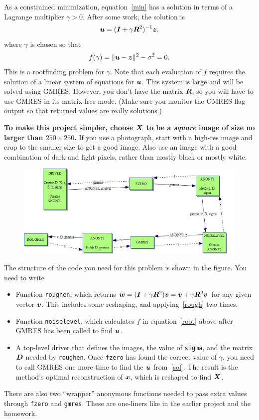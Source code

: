 \documentclass[11pt]{article}
\begin{document}
As a constrained minimization, equation~\eqref{min} has a solution in terms of
a Lagrange multiplier $\gamma>0$. After some work, the solution is
\begin{equation}
  \label{sol}
  \bm{u} = (\bm{I} + \gamma \bm{R}^2 )^{-1} \bm{z},
\end{equation}
where $\gamma$ is chosen so that 
\begin{equation}
  \label{root}
  f(\gamma) = \|\bm{u}-\bm{z}\|^2 - \sigma^2 = 0.
\end{equation}
This is a rootfinding problem for $\gamma$. Note that each evaluation
of $f$ requires the solution of a linear system of equations for $\bm{u}$.
This system is large and will be solved using GMRES. However, you
don't have the matrix $\bm{R}$, so you will have to use GMRES in its
matrix-free mode. (Make sure you monitor the GMRES flag output
so that returned values are really solutions.)



\textbf{To make this project simpler, choose $\bm{X}$ to be a \emph{square}
  image of size no larger than $250\times 250$.} If you use a
photograph, start with a high-res image and crop to the smaller size
to get a good image. Also use an image with a good combination of dark
and light pixels, rather than mostly black or mostly white.

\begin{figure}[htbp]
  \centering
  \includegraphics[width=6.5in]{codestruct}  
\end{figure}
The structure of the code you need for this problem is shown in the
figure. You need to write 
\begin{itemize}
\item Function \texttt{roughen}, which returns $\bm{w}=(\bm{I}+\gamma \bm{R}^2)\bm{v} = \bm{v}
  + \gamma \bm{R}^2\bm{v}$ for any given vector $\bm{v}$. This includes some
  reshaping, and applying~\eqref{rough} two times.
\item Function \texttt{noiselevel}, which calculates $f$ in
  equation~\eqref{root} above after GMRES has been called to find $\bm{u}$.
\item A top-level driver that defines the images, the value of
  \texttt{sigma}, and the matrix $\bm{D}$ needed by \texttt{roughen}. Once
  \texttt{fzero} has found the correct value of $\gamma$, you need to
  call GMRES one more time to find the $\bm{u}$ from~\eqref{sol}. The result is the
  method's optimal reconstruction of $\bm{x}$, which is reshaped to find $\bm{X}$.
\end{itemize}
There are also two ``wrapper'' anonymous functions needed to pass
extra values through \texttt{fzero} and \texttt{gmres}. These are
one-liners like in the earlier project and the homework.
\end{document}
